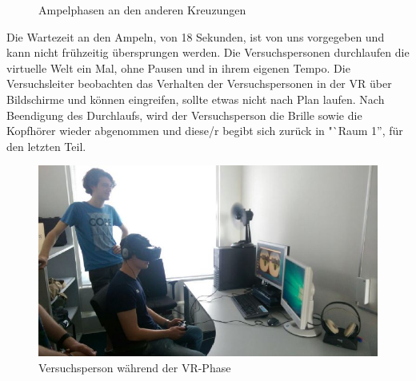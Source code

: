 \documentclass{Bericht}
\begin{document}
\begin{figure}[H]
	\caption{Ampelphasen an den anderen Kreuzungen}
	\label{img:ampelphasen-2}
\end{figure}

Die Wartezeit an den Ampeln, von 18 Sekunden, ist von uns vorgegeben und kann nicht frühzeitig übersprungen werden. Die Versuchspersonen durchlaufen die virtuelle Welt ein Mal, ohne Pausen und in ihrem eigenen Tempo. Die Versuchsleiter beobachten das Verhalten der Versuchspersonen in der VR über Bildschirme und können eingreifen, sollte etwas nicht nach Plan laufen. Nach Beendigung des Durchlaufs, wird der Versuchsperson die Brille sowie die Kopfhörer wieder abgenommen und diese/r begibt sich zurück in "`Raum 1'', für den letzten Teil.

\begin{figure}[H]
	\centering    
	\includegraphics[height=\textheight, width=\linewidth, keepaspectratio]{../Bilder/v.jpg}
	\caption{Versuchsperson während der VR-Phase}
	\label{img:versuchsperson-in-vr}
\end{figure}
\end{document}

